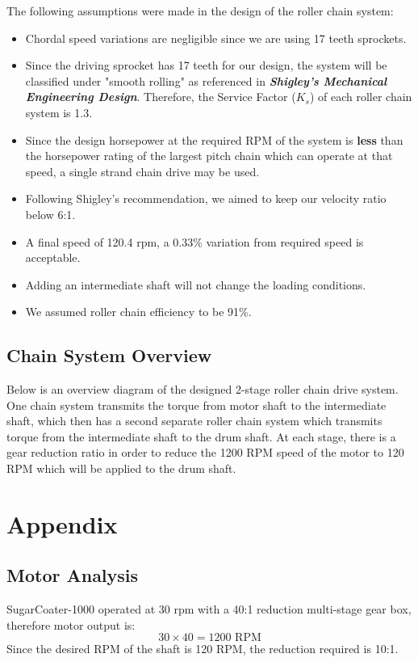 \documentclass[letterpaper,12pt]{article}
\begin{document}
\noindent The following assumptions were made in the design of the roller chain system:
\begin{itemize}
    \itemsep0em
    \item Chordal speed variations are negligible since we are using 17 teeth sprockets.
    \item Since the driving sprocket has 17 teeth for our design, the system will be classified under "smooth rolling" as referenced in \textbf{\textit{Shigley's Mechanical Engineering Design}}. Therefore, the Service Factor ($K_s$) of each roller chain system is 1.3.
    \item Since the design horsepower at the required RPM of the system is \textbf{less} than the horsepower rating of the largest pitch chain which can operate at that speed, a single strand chain drive may be used.
    \item Following Shigley's recommendation, we aimed to keep our velocity ratio below 6:1.
    \item A final speed of 120.4 rpm, a 0.33\% variation from required speed is acceptable.
    \item Adding an intermediate shaft will not change the loading conditions.
    \item We assumed roller chain efficiency to be 91\%.
\end{itemize}

\subsection{Chain System Overview}
Below is an overview diagram of the designed 2-stage roller chain drive system. One chain system transmits the torque from motor shaft to the intermediate shaft, which then has a second separate roller chain system which transmits torque from the intermediate shaft to the drum shaft. At each stage, there is a gear reduction ratio in order to reduce the 1200 RPM speed of the motor to 120 RPM which will be applied to the drum shaft.

\newpage

\section{Appendix}
\subsection{Motor Analysis}
SugarCoater-1000 operated at 30 rpm with a 40:1 reduction multi-stage gear box, therefore motor output is:
$$30 \times 40 = 1200 \text{ RPM}$$
Since the desired RPM of the shaft is 120 RPM, the reduction required is 10:1.
\end{document}
